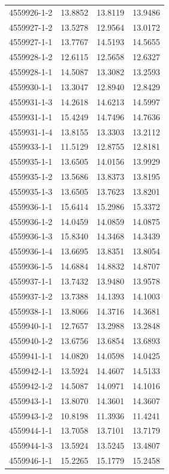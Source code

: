 \begin{longtable}{lrrr}
4559926-1-2 & 13.8852 & 13.8119 & 13.9486 \\
4559927-1-2 & 13.5278 & 12.9564 & 13.0172 \\
4559927-1-1 & 13.7767 & 14.5193 & 14.5655 \\
4559928-1-2 & 12.6115 & 12.5658 & 12.6327 \\
4559928-1-1 & 14.5087 & 13.3082 & 13.2593 \\
4559930-1-1 & 13.3047 & 12.8940 & 12.8429 \\
4559931-1-3 & 14.2618 & 14.6213 & 14.5997 \\
4559931-1-1 & 15.4249 & 14.7496 & 14.7636 \\
4559931-1-4 & 13.8155 & 13.3303 & 13.2112 \\
4559933-1-1 & 11.5129 & 12.8755 & 12.8181 \\
4559935-1-1 & 13.6505 & 14.0156 & 13.9929 \\
4559935-1-2 & 13.5686 & 13.8373 & 13.8195 \\
4559935-1-3 & 13.6505 & 13.7623 & 13.8201 \\
4559936-1-1 & 15.6414 & 15.2986 & 15.3372 \\
4559936-1-2 & 14.0459 & 14.0859 & 14.0875 \\
4559936-1-3 & 15.8340 & 14.3468 & 14.3439 \\
4559936-1-4 & 13.6695 & 13.8351 & 13.8054 \\
4559936-1-5 & 14.6884 & 14.8832 & 14.8707 \\
4559937-1-1 & 13.7432 & 13.9480 & 13.9578 \\
4559937-1-2 & 13.7388 & 14.1393 & 14.1003 \\
4559938-1-1 & 13.8066 & 14.3716 & 14.3681 \\
4559940-1-1 & 12.7657 & 13.2988 & 13.2848 \\
4559940-1-2 & 13.6756 & 13.6854 & 13.6893 \\
4559941-1-1 & 14.0820 & 14.0598 & 14.0425 \\
4559942-1-1 & 13.5924 & 14.4607 & 14.5133 \\
4559942-1-2 & 14.5087 & 14.0971 & 14.1016 \\
4559943-1-1 & 13.8070 & 14.3601 & 14.3607 \\
4559943-1-2 & 10.8198 & 11.3936 & 11.4241 \\
4559944-1-1 & 13.7058 & 13.7101 & 13.7179 \\
4559944-1-3 & 13.5924 & 13.5245 & 13.4807 \\
4559946-1-1 & 15.2265 & 15.1779 & 15.2458 \\

\end{longtable}
